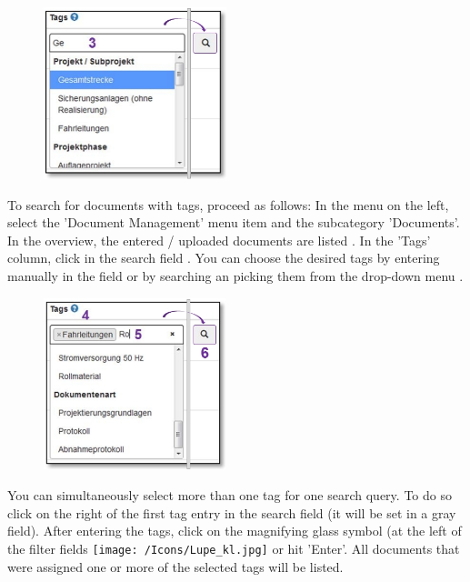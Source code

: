 \begin{figure}
\vspace{-30pt}
\includegraphics[height=50mm]{../chapters/11_Dokumentenablage/pictures/11-2-8_DokTagHinzufuegen.jpg}
\end{figure}
To search for documents with tags, proceed as follows:
In the menu on the left, select the 'Document Management' menu item and the subcategory 'Documents'. In the overview, the entered / uploaded documents are listed . In the 'Tags' column, click in the search field . You can choose the desired tags by entering manually in the field or by searching an picking them from the drop-down menu .

\vspace{\baselineskip}

\begin{figure}
\vspace{-30pt}
\includegraphics[height=50mm]{../chapters/11_Dokumentenablage/pictures/11-2-8_TagEingabe.jpg}
\end{figure}
You can simultaneously select more than one tag for one search query. To do so click on the right of the first tag entry  in the search field  (it will be set in a gray field). After entering the tags, click on the magnifying glass symbol (at the left of the filter fields \texttt{[image: /Icons/Lupe\_kl.jpg]}  or hit 'Enter'. All documents that were assigned one or more of the selected tags will be listed.

